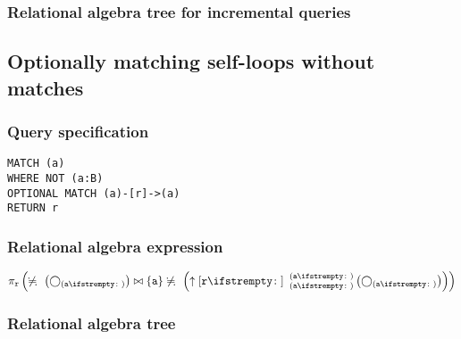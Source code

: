 \subsubsection*{Relational algebra tree for incremental queries}


\subsection{Optionally matching self-loops without matches}

\subsubsection*{Query specification}

\begin{lstlisting}
MATCH (a)
WHERE NOT (a:B)
OPTIONAL MATCH (a)-[r]->(a)
RETURN r
\end{lstlisting}

\subsubsection*{Relational algebra expression}

$\projection{\var{r}} \left(\alldifferent{} \left(\getvertices{a}{}\right) \join \{\var{a}\} \alldifferent{} \left(\expandout{r}{}{a}{a}{} \left(\getvertices{a}{}\right)\right)\right)$

\subsubsection*{Relational algebra tree}


